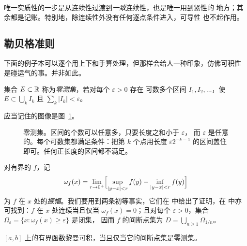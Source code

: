唯一实质性的一步是从连续性过渡到\emph{一致}连续性，也是唯一用到紧性的
地方；其余都是记账。特别地，除连续性外没有任何逐点条件进入，可导性
也不起作用。

\subsection{勒贝格准则}

下面的例子本可以逐个用上下和手算处理，但那样会给人一种印象，仿佛可积性
是碰运气的事。并非如此。

\begin{definition}
集合 $E \subset \mathbb{R}$ 称为\emph{零测集}，若对每个 $\varepsilon>0$ 存在
可数多个区间 $I_1,I_2,\dots$，使 $E \subset \bigcup_k I_k$ 且
$\sum_k |I_k| < \varepsilon$。
\end{definition}

应当记住的图像是图~\ref{fig:measurezero}。

\begin{figure}[htbp]
\centering
{}
\caption{零测集。区间的个数可以任意多，只要长度之和小于 $\varepsilon$，
而 $\varepsilon$ 是任意的。每个可数集都满足条件：把第 $k$ 个点用长度
$\varepsilon 2^{-k-1}$ 的区间盖住即可。任何正长度的区间都不满足。}
\label{fig:measurezero}
\end{figure}

对有界的 $f$，记
\[ \omega_f(x) = \lim_{r\to 0^+}\Bigl[\sup_{|y-x|<r} f(y)
   - \inf_{|y-x|<r} f(y)\Bigr] \]
为 $f$ 在 $x$ 处的\emph{振幅}。我们要用到两条初等事实，它们在
\cite[第 2 章与第 4 章附录]{annotated} 中给出了证明，在
\cite[第 21 讲]{yupin} 中亦可找到：$f$ 在 $x$ 处连续当且仅当
$\omega_f(x)=0$；且对每个 $\varepsilon>0$，集合
$\Omega_\varepsilon = \{x : \omega_f(x)\ge\varepsilon\}$ 是闭集，
因而 $f$ 的间断点集为 $D = \bigcup_{n\ge1}\Omega_{1/n}$。

\begin{theorem}[勒贝格准则]\label{thm:lebesgue}
$[a,b]$ 上的有界函数黎曼可积，当且仅当它的间断点集是零测集。
\end{theorem}

